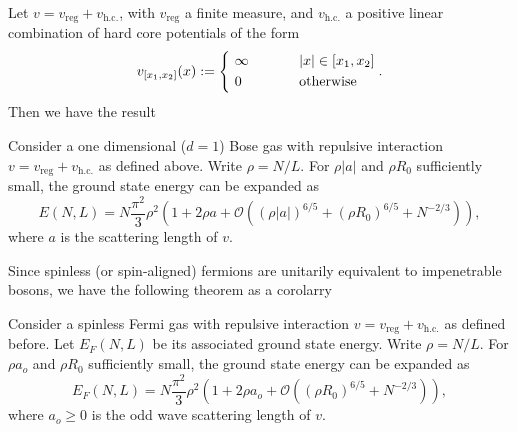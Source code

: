 \documentclass[final]{beamer}
\newlength{\colwidth}
\begin{document}
\begin{frame}[t]
\begin{columns}[t]
\begin{column}{\colwidth}
		\begin{tcolorbox}[colframe=qmathblue,colback=qmathbluelyslyslys,title=Main result]
			Let $ v=v_{\text{reg}}+v_{\text{h.c.}} $, with $ v_{\text{reg}} $ a finite measure, and $ v_{\text{h.c.}} $ a positive linear combination of hard core potentials of the form 
			\begin{equation*}
			v_{[x_1,x_2]}(x):=\begin{cases*}
			\ \infty& \phantom{when} $|x|\in [x_1,x_2]$\\
			\ 0 & \phantom{when} \text{otherwise}
			\end{cases*}.
			\end{equation*}
			Then we have the result
			\begin{theorem}
				\label{TheoremMain}
				Consider a one dimensional ($ d=1 $) Bose gas with repulsive interaction  $v=v_{\text{reg}}+v_{\text{h.c.}}$ as defined above. Write $\rho=N/L$. For $\rho|a|$ and $\rho R_0$ sufficiently small, the ground state energy can be expanded as 
				\begin{equation}
				\label{result}
				E(N,L)=N\frac{\pi^2}{3}\rho^2\left(1+2\rho a+
				\mathcal{O}
				\left((\rho|a|)^{6/5}+(\rho R_0)^{6/5}+N^{-2/3}\right)\right),
				\end{equation}
				where $a$ is the scattering length of $v$.
			\end{theorem}
			Since spinless (or spin-aligned) fermions are unitarily equivalent to impenetrable bosons, we have the following theorem as a corolarry 
			\begin{theorem}\label{TheoremFermion}
				Consider a spinless Fermi gas with repulsive interaction  $v=v_{\text{reg}}+v_{\text{h.c.}}$ as defined before. Let $ E_F(N,L)$ be its associated ground state energy. Write $\rho=N/L$. For $\rho a_o$ and $\rho R_0$ sufficiently small, the ground state energy can be expanded as 
				\begin{equation}
				E_F(N,L)=N\frac{\pi^2}{3}\rho^2\left(1+2\rho a_o+\mathcal{O}\left(\left(\rho R_0\right)^{6/5}+N^{-2/3}\right)\right),
				\end{equation}
				where $ a_o\geq0 $ is the odd wave scattering length of $v$. 
			\end{theorem} 
		\end{tcolorbox}\vspace{0.75cm}	
		

\end{column}
\end{columns}
\end{frame}
\end{document}
